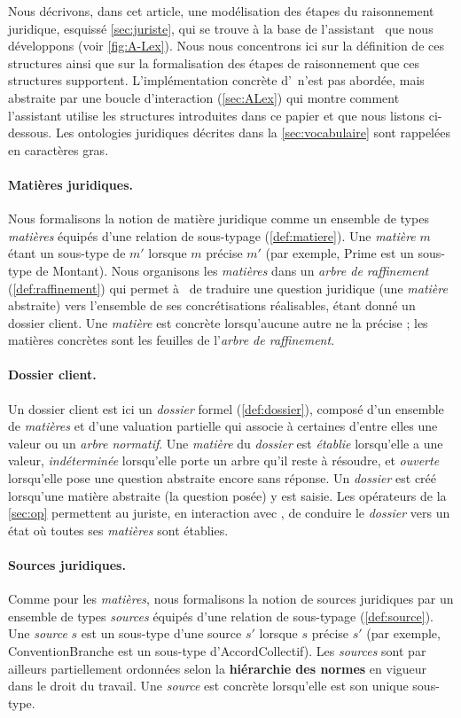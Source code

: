 Nous décrivons, dans cet article, une modélisation des étapes du raisonnement juridique, esquissé \autoref{sec:juriste}, qui se trouve à la base de l'assistant \ALex~que nous développons (voir \autoref{fig:A-Lex}). Nous nous concentrons ici sur la définition de ces structures ainsi que sur la formalisation des étapes de raisonnement que ces structures supportent. L'implémentation concrète d'\ALex~n'est pas abordée, mais abstraite par une boucle d'interaction (\autoref{sec:ALex}) qui montre comment l'assistant utilise les structures introduites dans ce papier et que nous listons ci-dessous. Les ontologies juridiques décrites dans la \autoref{sec:vocabulaire} sont rappelées en caractères gras.
\paragraph{Matières juridiques.}
Nous formalisons la notion de matière juridique comme un ensemble de types \emph{matières} équipés d'une relation de sous-typage (\autoref{def:matiere}). Une \emph{matière} $m$ étant un sous-type de $m'$ lorsque $m$ précise $m'$ (par exemple, \textsf{Prime} est un sous-type de \textsf{Montant}). Nous organisons les \emph{matières} dans un \emph{arbre de raffinement} (\autoref{def:raffinement}) qui permet à \ALex~de traduire une question juridique (une \emph{matière} abstraite) vers l'ensemble de ses concrétisations réalisables, étant donné un dossier client. Une \emph{matière} est concrète lorsqu'aucune autre ne la précise ; les matières concrètes sont les feuilles de l'\emph{arbre de raffinement}.
\paragraph{Dossier client.}%
Un dossier client est ici un \emph{dossier} formel (\autoref{def:dossier}), composé d'un ensemble de \emph{matières} et d'une valuation partielle qui associe à certaines d'entre elles une valeur ou un \emph{arbre normatif}. Une \emph{matière} du \emph{dossier} est \emph{établie} lorsqu'elle a une valeur, \emph{indéterminée} lorsqu'elle porte un arbre qu'il reste à résoudre, et \emph{ouverte} lorsqu'elle pose une question abstraite encore sans réponse. Un \emph{dossier} est créé lorsqu'une matière abstraite (la question posée) y est saisie. Les opérateurs de la \autoref{sec:op} permettent au juriste, en interaction avec \ALex, de conduire le \emph{dossier} vers un état où toutes ses \emph{matières} sont établies. 
\paragraph{Sources juridiques.}
Comme pour les \emph{matières}, nous formalisons la notion de sources juridiques par un ensemble de types \emph{sources} équipés d'une relation de sous-typage (\autoref{def:source}). Une \emph{source} $s$ est un sous-type d'une source $s'$ lorsque $s$ précise $s'$ (par exemple, \textsf{ConventionBranche} est un sous-type d'\textsf{AccordCollectif}). Les \emph{sources} sont par ailleurs partiellement ordonnées selon la \textbf{hiérarchie des normes} en vigueur dans le droit du travail. Une \emph{source} est concrète lorsqu'elle est son unique sous-type.
